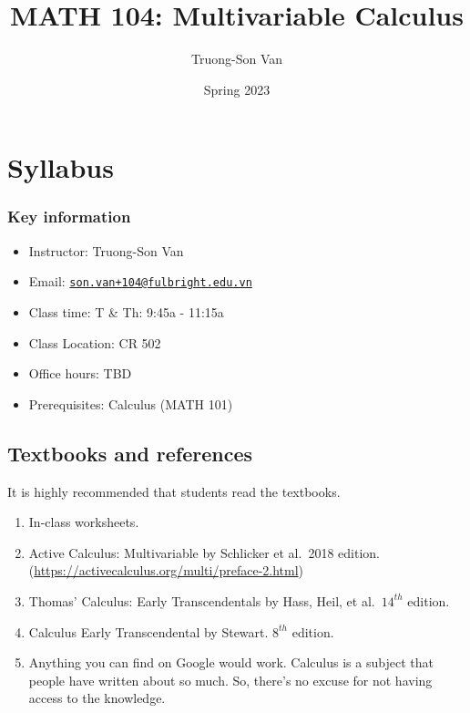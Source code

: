 \documentclass[
]{article}
\title{MATH 104: Multivariable Calculus}
\author{Truong-Son Van}
\date{Spring 2023}
\providecommand{\tightlist}{%
  \setlength{\itemsep}{0pt}\setlength{\parskip}{0pt}}
\begin{document}
\maketitle

{
\setcounter{tocdepth}{2}
\tableofcontents
}
\hypertarget{syllabus}{%
\section*{Syllabus}\label{syllabus}}

\hypertarget{key-information}{%
\subsubsection*{Key information}\label{key-information}}

\begin{itemize}
\tightlist
\item
  Instructor: Truong-Son Van
\item
  Email: \href{mailto:son.van+104@fulbright.edu.vn}{\nolinkurl{son.van+104@fulbright.edu.vn}}
\item
  Class time: T \& Th: 9:45a - 11:15a
\item
  Class Location: CR 502
\item
  Office hours: TBD
\item
  Prerequisites: Calculus (MATH 101)
\end{itemize}

\hypertarget{textbooks-and-references}{%
\subsection*{Textbooks and references}\label{textbooks-and-references}}

It is highly recommended that students read the textbooks.

\begin{enumerate}
\def\labelenumi{\arabic{enumi}.}
\item
  In-class worksheets.
\item
  Active Calculus: Multivariable by Schlicker et al.~2018 edition.
  (\url{https://activecalculus.org/multi/preface-2.html})
\item
  Thomas' Calculus: Early Transcendentals by Hass, Heil, et al.~\(14^{th}\) edition.
\item
  Calculus Early Transcendental by Stewart. \(8^{th}\) edition.
\item
  Anything you can find on Google would work.
  Calculus is a subject that people have written about
  so much. So, there's no excuse for not having access
  to the knowledge.
\end{enumerate}
\end{document}
